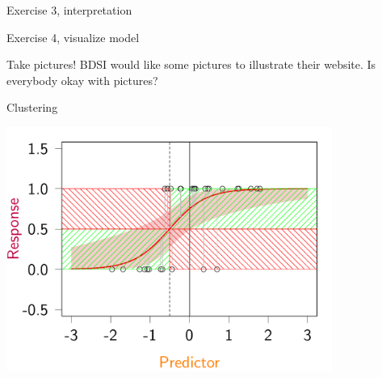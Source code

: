 \documentclass{beamer}\usepackage[]{graphicx}\usepackage[]{color}
\begin{document}
\begin{frame}{Exercise 3, interpretation}


\end{frame}
\begin{frame}{Exercise 4, visualize model}


\end{frame}

\begin{frame}{Take pictures!}
BDSI would like some pictures to illustrate their website. Is everybody okay with pictures?
\end{frame}

\begin{frame}{Clustering}

\includegraphics[width=0.8\textwidth]{figure/logreg3-1}

\end{frame}
\end{document}
